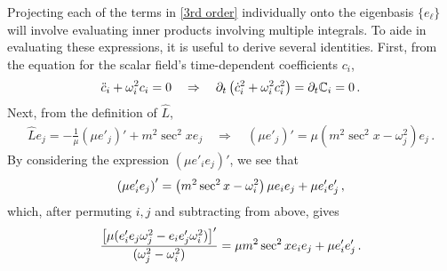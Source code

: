 \documentclass[../PhD.tex]{subfiles}
\begin{document}
\begin{subappendices}
Projecting each of the terms in \eqref{3rd order} individually onto the eigenbasis $\{ e_\ell \}$ will involve evaluating inner products involving multiple integrals. To aide in evaluating these expressions, it is useful to derive several identities. First, from the equation for the scalar field's time-dependent coefficients $c_i$,
\begin{align} 
\ddot c_i + \omega_i^2 c_i = 0 \quad \Rightarrow \quad \partial_t \left(\dot c_i^2 + \omega_i^2 c_i^2 \right) = \partial_t \mathbb C_i = 0 \, .
\end{align}
Next, from the definition of $\hat L$,
\begin{align}
\hat L e_j = -\frac{1}{\mu} \left( \mu e'_j \right)' + m^2 \sec^2 x e_j \quad \Rightarrow \quad \left( \mu e'_j \right)' = \mu \left( m^2 \sec^2 x - \omega_j^2 \right) e_j \, .
\end{align}
By considering the expression $\left( \mu e'_i e_j \right)'$, we see that
\begin{align}
\left( \mu e'_i e_j \right) ' = \left(m^2 \sec^2 x - \omega_i^2 \right) \mu e_i e_j + \mu e'_i e'_j \, ,
\end{align}
which, after permuting $i, j$ and subtracting from above, gives
\begin{align}
\frac{\left[ \mu (e'_i e_j \omega_j^2 - e_i e'_j \omega_i^2 ) \right]'}{(\omega_j^2 - \omega_i^2)} = \mu m^2 \sec^2 x e_i e_j + \mu e'_i e'_j \, .
\end{align}


\end{subappendices}
\end{document}
